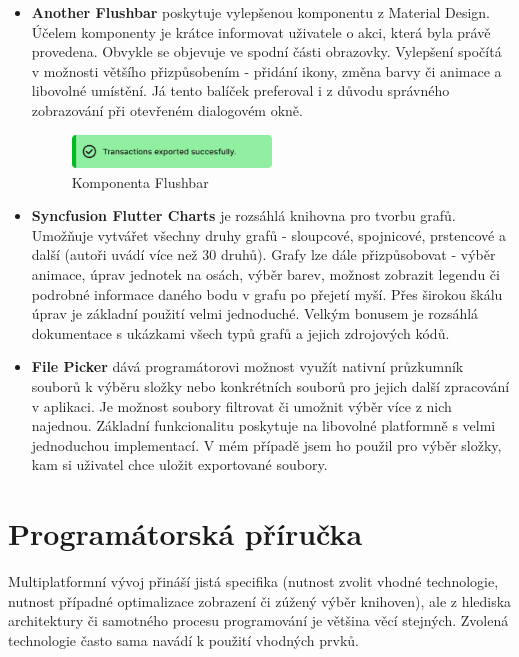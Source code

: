 \documentclass[
  biblatex,
  figures=true,
  tables=false,
  glossaries,
  index
]{kidiplom}
\begin{document}
\begin{itemize}
  \item \textbf{Another Flushbar} \cite{flushbar} poskytuje vylepšenou komponentu  z Material Design. Účelem komponenty je krátce informovat uživatele o akci, která byla právě provedena. Obvykle se objevuje ve spodní části obrazovky. Vylepšení spočítá v možnosti většího přizpůsobením - přidání ikony, změna barvy či animace a libovolné umístění. Já tento balíček preferoval i z důvodu správného zobrazování při otevřeném dialogovém okně.

  \begin{figure}
    \centering
    \includegraphics[width=0.5\textwidth]{images/flushbar.pdf}
    \caption{Komponenta Flushbar}
  \end{figure}
      
  \item \textbf{Syncfusion Flutter Charts} \cite{syncfusion-charts} je rozsáhlá knihovna pro tvorbu grafů. Umožňuje vytvářet všechny druhy grafů - sloupcové, spojnicové, prstencové a další (autoři uvádí více než 30 druhů). Grafy lze dále přizpůsobovat - výběr animace, úprav jednotek na osách, výběr barev, možnost zobrazit legendu či podrobné informace daného bodu v grafu po přejetí myší. Přes širokou škálu úprav je základní použití velmi jednoduché. Velkým bonusem je rozsáhlá dokumentace s ukázkami všech typů grafů a jejich zdrojových kódů.
  \item \textbf{File Picker} \cite{file-picker} dává programátorovi možnost využít nativní průzkumník souborů k výběru složky nebo konkrétních souborů pro jejich další zpracování v aplikaci. Je možnost soubory filtrovat či umožnit výběr více z nich najednou. Základní funkcionalitu poskytuje na libovolné platformně s velmi jednoduchou implementací. V mém případě jsem ho použil pro výběr složky, kam si uživatel chce uložit exportované soubory. 
\end{itemize}


\section{Programátorská příručka}

Multiplatformní vývoj přináší jistá specifika (nutnost zvolit vhodné technologie, nutnost případné optimalizace zobrazení či zúžený výběr knihoven), ale z hlediska architektury či samotného procesu programování je většina věcí stejných. Zvolená technologie často sama navádí k použití vhodných prvků.
\end{document}
